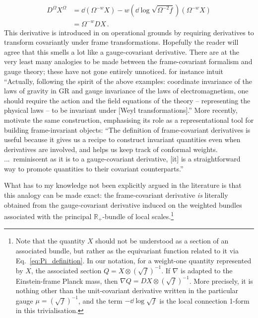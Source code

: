 \documentclass[12pt]{article}
\numberwithin{equation}{section}
\newcommand{\R}{\mathbb{R}}
\begin{document}
\begin{equation}
\begin{split}
    D^\Omega X^\Omega &= \dd (\Omega^{-w}X) - w(\dd \log \sqrt{\Omega^{-2}f})(\Omega^{-w}X)\\
    &= \Omega^{-w}DX\,.    
\end{split}	
\end{equation}
This derivative is introduced in \citet{Karamitsos2018} on operational grounds by requiring derivatives to transform covariantly under frame transformations. Hopefully the reader will agree that this smells a lot like a gauge-covariant derivative. There are at the very least many analogies to be made between the frame-covariant formalism and gauge theory; these have not gone entirely unnoticed. \citet[p.~3]{QuirosDeArcia2018} for instance intuit ``Actually, following the spirit of the above examples: coordinate invariance of the laws of gravity in GR and gauge invariance of the laws of electromagnetism, one should require the action and the field equations of the theory -- representing the physical laws -- to be invariant under [Weyl transformations].'' More recently, \citet[p.~8]{JarvKaramitsos2026} motivate the same construction, emphasising its role as a representational tool for building frame-invariant objects: ``The definition of frame-covariant derivatives is useful because it gives us a recipe to construct invariant quantities even when derivatives are involved, and helps us keep track of conformal weights. ...~reminiscent as it is to a gauge-covariant derivative, [it] is a straightforward way to promote quantities to their covariant counterparts.''

What has to my knowledge not been explicitly argued in the literature is that this analogy can be made exact: the frame-covariant derivative \emph{is} literally obtained from the gauge-covariant derivative induced on the weighted bundles associated with the principal $\R_+$-bundle of local scales.\footnote{Note that the quantity $X$ should not be understood as a section of an associated bundle, but rather as the equivariant function related to it via Eq.~\eqref{eq:Pi_definition}. In our notation, for a weight-one quantity represented by $X$, the associated section $Q=X\otimes (\sqrt{f})^{-1}$. If $\nabla$ is adapted to the Einstein-frame Planck mass, then ${\nabla Q=DX\otimes (\sqrt{f})^{-1}}$. More precisely, it is nothing other than the unit-covariant derivative written in the particular gauge ${\mu = (\sqrt{f})^{-1}}$, and the term $-\dd \log\sqrt{f}$ is the local connection 1-form in this trivialisation.}
\end{document}
